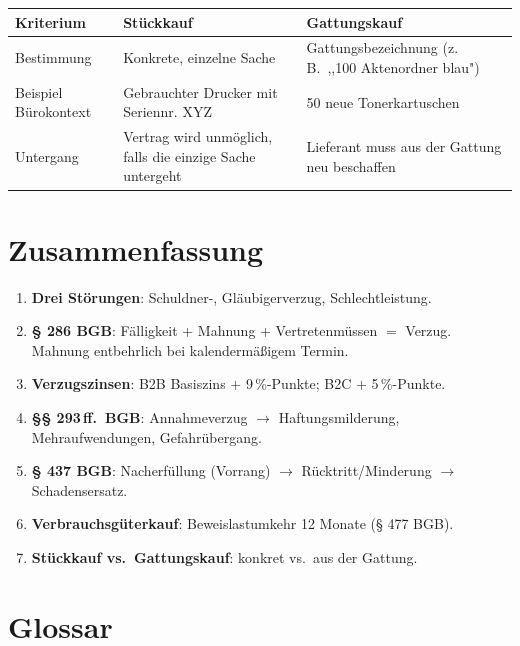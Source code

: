 \documentclass[11pt, a4paper]{article}
\begin{document}
\begin{center}
\begin{tabular}{p{4cm} p{5cm} p{5cm}}
\toprule
\textbf{Kriterium} & \textbf{Stückkauf} & \textbf{Gattungskauf}\\
\midrule
Bestimmung & Konkrete, einzelne Sache & Gattungsbezeichnung (z.\,B.\ ,,100 Aktenordner blau")\\
Beispiel Bürokontext & Gebrauchter Drucker mit Seriennr. XYZ & 50 neue Tonerkartuschen\\
Untergang & Vertrag wird unmöglich, falls die einzige Sache untergeht & Lieferant muss aus der Gattung neu beschaffen\\
\bottomrule
\end{tabular}
\end{center}

\section{Zusammenfassung}

\begin{enumerate}[itemsep=2pt]
  \item \textbf{Drei Störungen}: Schuldner-, Gläubigerverzug, Schlechtleistung.
  \item \textbf{§ 286 BGB}: Fälligkeit + Mahnung + Vertretenmüssen $=$ Verzug. Mahnung entbehrlich bei kalendermäßigem Termin.
  \item \textbf{Verzugszinsen}: B2B Basiszins $+$ 9\,\%-Punkte; B2C $+$ 5\,\%-Punkte.
  \item \textbf{§§ 293\,ff.\ BGB}: Annahmeverzug $\to$ Haftungsmilderung, Mehraufwendungen, Gefahrübergang.
  \item \textbf{§ 437 BGB}: Nacherfüllung (Vorrang) $\to$ Rücktritt/Minderung $\to$ Schadensersatz.
  \item \textbf{Verbrauchsgüterkauf}: Beweislastumkehr 12 Monate (§ 477 BGB).
  \item \textbf{Stückkauf vs.\ Gattungskauf}: konkret vs.\ aus der Gattung.
\end{enumerate}

\newpage

\section*{Glossar}

\end{document}
